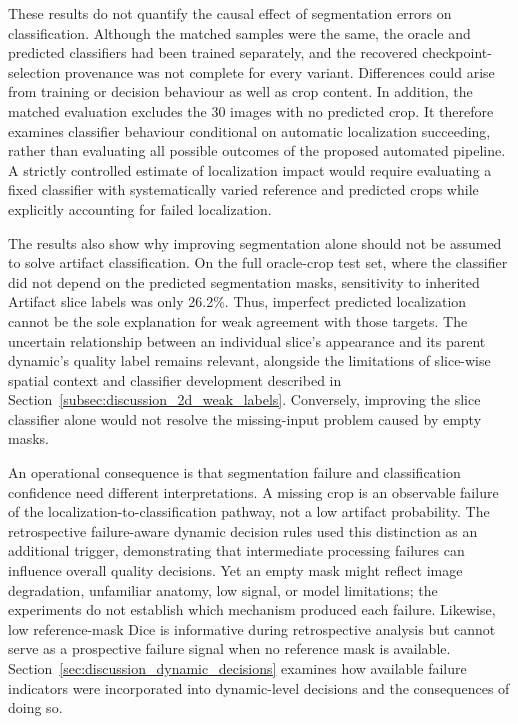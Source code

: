 These results do not quantify the causal effect of segmentation errors on classification. Although the matched samples were the same, the oracle and predicted classifiers had been trained separately, and the recovered checkpoint-selection provenance was not complete for every variant. Differences could arise from training or decision behaviour as well as crop content. In addition, the matched evaluation excludes the 30 images with no predicted crop. It therefore examines classifier behaviour conditional on automatic localization succeeding, rather than evaluating all possible outcomes of the proposed automated pipeline. A strictly controlled estimate of localization impact would require evaluating a fixed classifier with systematically varied reference and predicted crops while explicitly accounting for failed localization.

The results also show why improving segmentation alone should not be assumed to solve artifact classification. On the full oracle-crop test set, where the classifier did not depend on the predicted segmentation masks, sensitivity to inherited Artifact slice labels was only 26.2\%. Thus, imperfect predicted localization cannot be the sole explanation for weak agreement with those targets. The uncertain relationship between an individual slice's appearance and its parent dynamic's quality label remains relevant, alongside the limitations of slice-wise spatial context and classifier development described in Section~\ref{subsec:discussion_2d_weak_labels}. Conversely, improving the slice classifier alone would not resolve the missing-input problem caused by empty masks.

An operational consequence is that segmentation failure and classification confidence need different interpretations. A missing crop is an observable failure of the localization-to-classification pathway, not a low artifact probability. The retrospective failure-aware dynamic decision rules used this distinction as an additional trigger, demonstrating that intermediate processing failures can influence overall quality decisions. Yet an empty mask might reflect image degradation, unfamiliar anatomy, low signal, or model limitations; the experiments do not establish which mechanism produced each failure. Likewise, low reference-mask Dice is informative during retrospective analysis but cannot serve as a prospective failure signal when no reference mask is available. Section~\ref{sec:discussion_dynamic_decisions} examines how available failure indicators were incorporated into dynamic-level decisions and the consequences of doing so.

